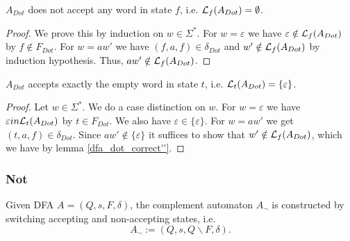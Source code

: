 \begin{lemma}
    \label{dfa_dot_correct''}
    $A_{Dot}$ does not accept any word in state $f$, i.e. $\mathcal{L}_{f}(A_{Dot}) = \emptyset$.
\end{lemma}
\begin{proof}
    We prove this by induction on $w \in \Sigma^*$. 
    For $w = \varepsilon$ we have $\varepsilon \notin \mathcal{L}_{f}(A_{Dot})$ by $f \notin F_{Dot}$.
    For $w = aw'$ we have $(f, a, f) \in \delta_{Dot}$ and $w' \notin \mathcal{L}_{f}(A_{Dot})$ by induction hypothesis.
    Thus, $aw' \notin \mathcal{L}_{f}(A_{Dot})$.
\end{proof}

\begin{lemma}
    \label{dfa_dot_correct'}
    $A_{Dot}$ accepts exactly the empty word in state $t$, i.e. $\mathcal{L}_{t}(A_{Dot}) = \{\varepsilon\}$.
\end{lemma}
\begin{proof}
    Let $w \in \Sigma^*$. 
    We do a case distinction on $w$.
    For $w = \varepsilon$ we have $\varepsilon in \mathcal{L}_{t}(A_{Dot})$ by $t \in F_{Dot}$. We also have $\varepsilon \in \{\varepsilon\}$.
    For $w = aw'$ we get $(t, a, f) \in \delta_{Dot}$. 
    Since $aw' \notin \{\varepsilon\}$ it suffices to show that 
    $w' \notin \mathcal{L}_{f}(A_{Dot})$,
    which we have by lemma \ref{dfa_dot_correct''}.
\end{proof}


\subsubsection{Not}
\begin{definition}
    Given DFA $A=(Q,s,F,\delta)$, the complement automaton $A_\neg$ is constructed by switching accepting and non-accepting states, i.e.
    \begin{equation*}
       A_\neg := (Q,s,Q\backslash F,\delta). 
    \end{equation*}
\end{definition}

